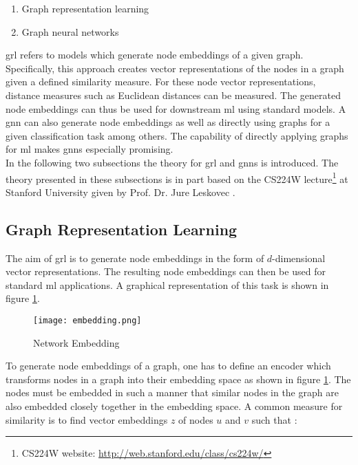	\begin{enumerate}
		\item Graph representation learning
		\item Graph neural networks
	\end{enumerate}
	
	\noindent \Acl{grl} refers to models which generate node
	embeddings of a given graph. Specifically, this approach creates vector 
	representations of the nodes in a graph given a defined similarity measure. 
	For these node vector representations, distance measures such as Euclidean 
	distances can be measured. The generated node embeddings can thus be used for
	downstream \acs{ml} using standard models. A \acl{gnn} can also generate 
	node embeddings as well as directly using graphs for a given classification 
	task among others. The capability of directly applying graphs for \acs{ml} 
	makes \acsp{gnn} especially promising. \\

	\noindent In the following two subsections the theory for \acs{grl} and
	\acsp{gnn} is introduced. The theory presented in these subsections is in 
	part based on the CS224W lecture\footnote{CS224W website:
	\url{http://web.stanford.edu/class/cs224w/}} at Stanford University given 
	by Prof. Dr. Jure Leskovec \citeyearpar{leskovec2021lecture}. 

	\subsection{Graph Representation Learning}

	The aim of \acf{grl} is to generate node embeddings in 
	the form of $d$-dimensional vector representations. The resulting node 
	embeddings can then be used for standard \acs{ml} applications. A graphical 
	representation of this task is shown in figure 
	\ref{fig:embedding}.

	\begin{figure}[h]
		\centering
		\texttt{[image: embedding.png]}
		\caption{Network Embedding}
		\cite{leskovec2021lecture}
		\label{fig:embedding}
	\end{figure}

	\noindent To generate node embeddings of a graph, one has to define an
	encoder which transforms nodes in a graph into their embedding space as
	shown in figure \ref{fig:embedding}. The nodes must be embedded in such a
	manner that similar nodes in the graph are also embedded closely together 
	in the embedding space. A common measure for similarity is to find vector 
	embeddings $z$ of nodes $u$ and $v$ such that \citep{leskovec2021lecture}:

